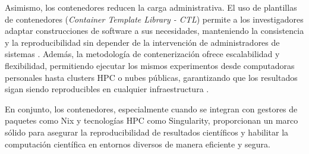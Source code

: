Asimismo, los contenedores reducen la carga administrativa. El uso de plantillas de contenedores (\textit{Container Template Library - CTL}) permite a los investigadores adaptar construcciones de software a sus necesidades, manteniendo la consistencia y la reproducibilidad sin depender de la intervención de administradores de sistemas \cite{Vaillancourt2020SelfScalingCA}. Además, la metodología de contenerización ofrece escalabilidad y flexibilidad, permitiendo ejecutar los mismos experimentos desde computadoras personales hasta clusters \acs{HPC} o nubes públicas, garantizando que los resultados sigan siendo reproducibles en cualquier infraestructura \cite{Vaillancourt2020SelfScalingCA}.

En conjunto, los contenedores, especialmente cuando se integran con gestores de paquetes como Nix y tecnologías \acs{HPC} como Singularity, proporcionan un marco sólido para asegurar la reproducibilidad de resultados científicos y habilitar la computación científica en entornos diversos de manera eficiente y segura.